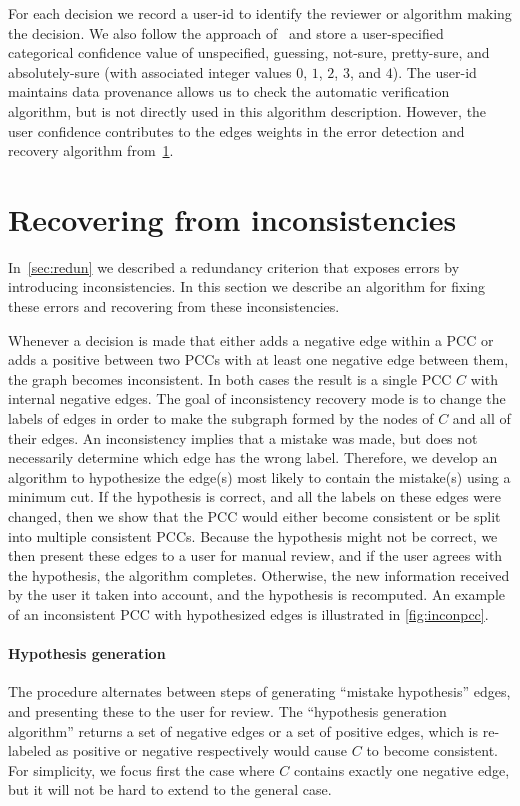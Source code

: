 For each decision we record a user-id to identify the reviewer or algorithm making the decision.
We also follow the approach of~\cite{branson_visual_2010} and store a user-specified categorical confidence value
  of unspecified, guessing, not-sure, pretty-sure, and absolutely-sure (with associated integer values $0$, $1$,
  $2$, $3$, and $4$).
The user-id maintains data provenance allows us to check the automatic verification algorithm, but is not
  directly used in this algorithm description.
However, the user confidence contributes to the edges weights in the error detection and recovery algorithm
  from~\cref{sec:incon}.


\section{Recovering from inconsistencies}\label{sec:incon}

In~\cref{sec:redun} we described a redundancy criterion that exposes errors by introducing inconsistencies.
In this section we describe an algorithm for fixing these errors and recovering from these inconsistencies.

Whenever a decision is made that either adds a negative edge within a PCC or adds a positive between two PCCs
  with at least one negative edge between them, the graph becomes inconsistent.
In both cases the result is a single PCC $C$ with internal negative edges.
The goal of inconsistency recovery mode is to change the labels of edges in order to make the subgraph formed by
  the nodes of $C$ and all of their edges.
An inconsistency implies that a mistake was made, but does not necessarily determine which edge has the wrong
  label.
Therefore, we develop an algorithm to hypothesize the edge(s) most likely to contain the mistake(s) using a
  minimum cut.
If the hypothesis is correct, and all the labels on these edges were changed, then we show that the PCC would
  either become consistent or be split into multiple consistent PCCs.
Because the hypothesis might not be correct, we then present these edges to a user for manual review, and if the
  user agrees with the hypothesis, the algorithm completes.
Otherwise, the new information received by the user it taken into account, and the hypothesis is recomputed.
An example of an inconsistent PCC with hypothesized edges is illustrated in \cref{fig:inconpcc}.

\inconpcc{}

\paragraph{Hypothesis generation}
The procedure alternates between steps of generating ``mistake hypothesis'' edges, and presenting these to the
  user for review.
The ``hypothesis generation algorithm'' returns a set of negative edges or a set of positive edges, which is
  re-labeled as positive or negative respectively would cause $C$ to become consistent.
For simplicity, we focus first the case where $C$ contains exactly one negative edge, but it will not be hard to
  extend to the general case.


